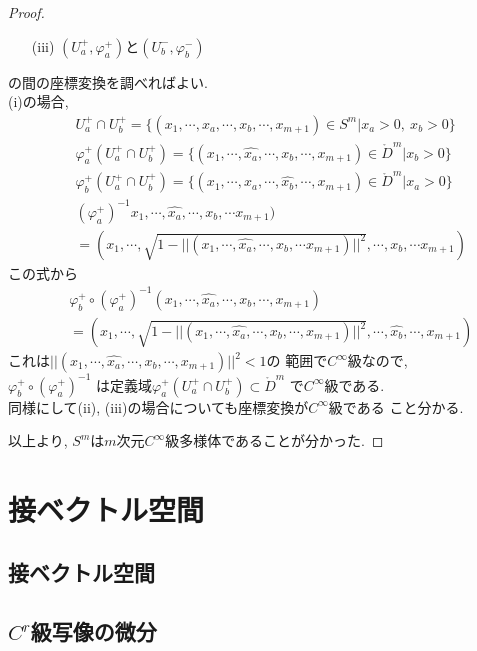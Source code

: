 \documentclass[a4j,12pt]{jarticle}
\theoremstyle{definition}
\begin{document}
\begin{proof}
\begin{itemize}
\begin{itemize}
            \item[(iii)] $(U_a^+,\varphi_a^+)$と$(U_b^-,\varphi_b^-)$ 
        \end{itemize}
        の間の座標変換を調べればよい. \\
        (i)の場合, 
        \begin{eqnarray*}
            &&U_a^+\cap U_b^+ =\{(x_1,\cdots ,x_a,\cdots ,x_b,\cdots ,x_{m+1})\in S^m|x_a>0,\ x_b>0\}\\
            &&\varphi_a^+(U_a^+\cap U_b^+) =\{(x_1,\cdots ,\hat{x_a},\cdots ,x_b,\cdots ,x_{m+1})\in \mathring{D}^m|x_b>0\}\\
            &&\varphi_b^+(U_a^+\cap U_b^+) =\{(x_1,\cdots ,x_a,\cdots ,\hat{x_b},\cdots ,x_{m+1})\in \mathring{D}^m|x_a>0\}\\
            &&(\varphi_a^+)^{-1}x_1,\cdots ,\hat{x_a},\cdots ,x_b,\cdots x_{m+1})\\
            &&=(x_1,\cdots ,\sqrt{1-||(x_1,\cdots ,\hat{x_a},\cdots ,x_b,\cdots x_{m+1})||^2},\cdots ,x_b,\cdots x_{m+1})
        \end{eqnarray*}
        この式から
        \begin{eqnarray*}
        &&\varphi_b^+\circ(\varphi_a^+)^{-1}(x_1,\cdots ,\hat{x_a},\cdots ,x_b,\cdots ,x_{m+1})\\
        &&=(x_1,\cdots ,\sqrt{1-||(x_1,\cdots ,\hat{x_a},\cdots ,x_b,\cdots ,x_{m+1})||^2},\cdots ,\hat{x_b},\cdots ,x_{m+1})
        \end{eqnarray*}
        これは$||(x_1,\cdots ,\hat{x_a},\cdots ,x_b,\cdots ,x_{m+1})||^2<1$の
        範囲で$C^{\infty}$級なので, \\$\varphi_b^+\circ(\varphi_a^+)^{-1}$
        は定義域$\varphi_a^+(U_a^+\cap U_b^+)\subset \mathring{D}^m$
        で$C^{\infty}$級である. \\
        同様にして(ii), (iii)の場合についても座標変換が$C^{\infty}$級である
        こと分かる. \\
    \end{itemize}
    以上より, $S^m$は$m$次元$C^{\infty}$級多様体であることが分かった. 
\end{proof}
%
\section{接ベクトル空間}
\subsection{接ベクトル空間}
\subsection{$C^r$級写像の微分}
\newpage
%
\end{document}
